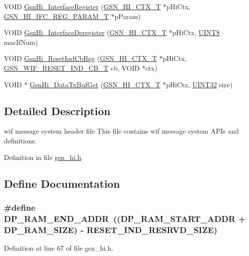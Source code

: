 \begin{DoxyCompactItemize}
\item 
VOID \hyperlink{a00504_a4966461f5997bca9c2640279059cb840}{GsnHi\_\-InterfaceRegister} (\hyperlink{a00085}{GSN\_\-HI\_\-CTX\_\-T} $\ast$pHiCtx, \hyperlink{a00087}{GSN\_\-HI\_\-IFC\_\-REG\_\-PARAM\_\-T} $\ast$pParam)
\item 
VOID \hyperlink{a00504_a4802c8ad658867c125be8ef68783103f}{GsnHi\_\-InterfaceDeregister} (\hyperlink{a00085}{GSN\_\-HI\_\-CTX\_\-T} $\ast$pHiCtx, \hyperlink{a00660_gab27e9918b538ce9d8ca692479b375b6a}{UINT8} macIfNum)
\item 
VOID \hyperlink{a00504_a75b8d10adc581a5881e0e406494b1fb2}{GsnHi\_\-ResetIndCbReg} (\hyperlink{a00085}{GSN\_\-HI\_\-CTX\_\-T} $\ast$pHiCtx, \hyperlink{a00635_gad71afa8e03b517ec379abfa3cb39de92}{GSN\_\-WIF\_\-RESET\_\-IND\_\-CB\_\-T} cb, VOID $\ast$ctx)
\item 
VOID $\ast$ \hyperlink{a00504_ae2e81f1cb1e6098cb4fbfa7bb7604f53}{GsnHi\_\-DataTxBufGet} (\hyperlink{a00085}{GSN\_\-HI\_\-CTX\_\-T} $\ast$pHiCtx, \hyperlink{a00660_gae1e6edbbc26d6fbc71a90190d0266018}{UINT32} size)
\end{DoxyCompactItemize}


\subsection{Detailed Description}
wif message system header file This file contains wif message system APIs and definitions. 

Definition in file \hyperlink{a00504_source}{gsn\_\-hi.h}.



\subsection{Define Documentation}
\hypertarget{a00504_ac44fe8ec6bb4d56cb75f549c72337159}{
\subsubsection[{DP\_\-RAM\_\-END\_\-ADDR}]{\setlength{\rightskip}{0pt plus 5cm}\#define DP\_\-RAM\_\-END\_\-ADDR~((DP\_\-RAM\_\-START\_\-ADDR + DP\_\-RAM\_\-SIZE) -\/ RESET\_\-IND\_\-RESRVD\_\-SIZE)}}
\label{a00504_ac44fe8ec6bb4d56cb75f549c72337159}


Definition at line 67 of file gsn\_\-hi.h.

